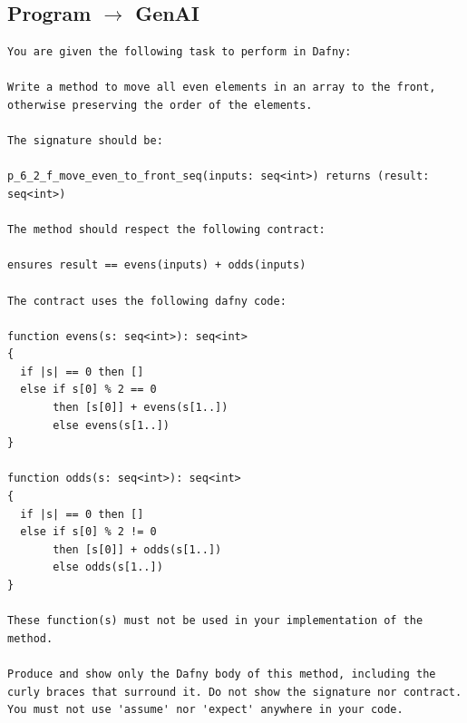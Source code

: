 \documentclass{article}
\begin{document}
\subsection*{Program $\rightarrow$ GenAI}
\begin{lstlisting}
You are given the following task to perform in Dafny:

Write a method to move all even elements in an array to the front, otherwise preserving the order of the elements.

The signature should be:

p_6_2_f_move_even_to_front_seq(inputs: seq<int>) returns (result: seq<int>)

The method should respect the following contract:

ensures result == evens(inputs) + odds(inputs)

The contract uses the following dafny code:

function evens(s: seq<int>): seq<int>
{
  if |s| == 0 then []
  else if s[0] % 2 == 0
       then [s[0]] + evens(s[1..])
       else evens(s[1..])
}

function odds(s: seq<int>): seq<int>
{
  if |s| == 0 then []
  else if s[0] % 2 != 0
       then [s[0]] + odds(s[1..])
       else odds(s[1..])
}

These function(s) must not be used in your implementation of the method.

Produce and show only the Dafny body of this method, including the curly braces that surround it. Do not show the signature nor contract. You must not use 'assume' nor 'expect' anywhere in your code.
\end{lstlisting}
\end{document}

